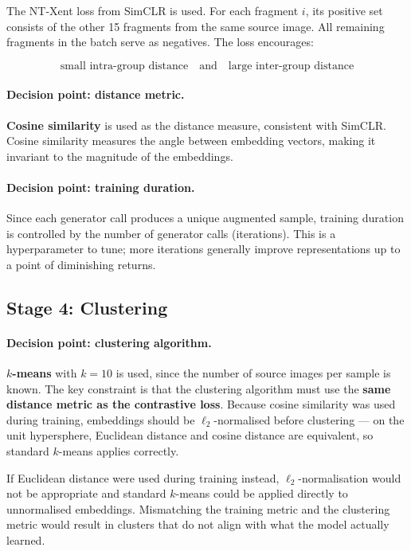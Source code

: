 \documentclass[12pt, a4paper]{article}
\begin{document}
The NT-Xent loss from SimCLR \parencite{simclr2020} is used. For each fragment $i$, its
positive set consists of the other 15 fragments from the same source image. All remaining
fragments in the batch serve as negatives. The loss encourages:

\[
\text{small intra-group distance} \quad \text{and} \quad \text{large inter-group distance}
\]

\paragraph{Decision point: distance metric.}
\textbf{Cosine similarity} is used as the distance measure, consistent with SimCLR.
Cosine similarity measures the angle between embedding vectors, making it invariant to
the magnitude of the embeddings.

\paragraph{Decision point: training duration.}
Since each generator call produces a unique augmented sample, training duration is
controlled by the number of generator calls (iterations). This is a hyperparameter to
tune; more iterations generally improve representations up to a point of diminishing
returns.

\subsection{Stage 4: Clustering}

\paragraph{Decision point: clustering algorithm.}
\textbf{$k$-means} with $k=10$ is used, since the number of source images per sample is
known. The key constraint is that the clustering algorithm must use the \textbf{same
distance metric as the contrastive loss}. Because cosine similarity was used during
training, embeddings should be $\ell_2$-normalised before clustering — on the unit
hypersphere, Euclidean distance and cosine distance are equivalent, so standard
$k$-means applies correctly.

If Euclidean distance were used during training instead, $\ell_2$-normalisation would
not be appropriate and standard $k$-means could be applied directly to unnormalised
embeddings. Mismatching the training metric and the clustering metric would result in
clusters that do not align with what the model actually learned.
\end{document}
